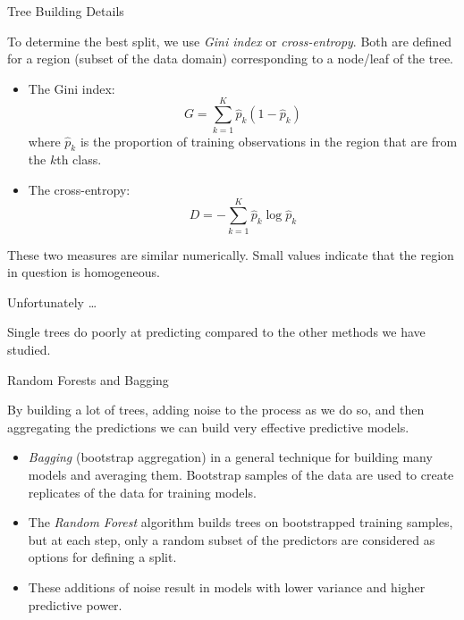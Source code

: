 \documentclass[
  ignorenonframetext,
]{beamer}
\providecommand{\tightlist}{%
  \setlength{\itemsep}{0pt}\setlength{\parskip}{0pt}}
\begin{document}
\begin{frame}{Tree Building Details}
\protect\hypertarget{tree-building-details}{}

To determine the best split, we use \emph{Gini index} or
\emph{cross-entropy}. Both are defined for a region (subset of the data
domain) corresponding to a node/leaf of the tree.

\begin{itemize}
\tightlist
\item
  The Gini index: \[
  G=\sum_{k=1}^K\hat p_{k}(1-\hat p_{k})
  \] where \(\hat p_{k}\) is the proportion of training observations in
  the region that are from the \(k\)th class.
\item
  The cross-entropy: \[
  D=-\sum_{k=1}^K\hat p_{k}\log\hat p_{k}
  \]
\end{itemize}

These two measures are similar numerically. Small values indicate that
the region in question is homogeneous.

\end{frame}

\begin{frame}{Unfortunately \ldots}
\protect\hypertarget{unfortunately}{}

Single trees do poorly at predicting compared to the other methods we
have studied.

\end{frame}

\begin{frame}{Random Forests and Bagging}
\protect\hypertarget{random-forests-and-bagging}{}

By building a lot of trees, adding noise to the process as we do so, and
then aggregating the predictions we can build very effective predictive
models.

\begin{itemize}
\tightlist
\item
  \emph{Bagging} (bootstrap aggregation) in a general technique for
  building many models and averaging them. Bootstrap samples of the data
  are used to create replicates of the data for training models.
\item
  The \emph{Random Forest} algorithm builds trees on bootstrapped
  training samples, but at each step, only a random subset of the
  predictors are considered as options for defining a split.
\item
  These additions of noise result in models with lower variance and
  higher predictive power.
\end{itemize}

\end{frame}
\end{document}
